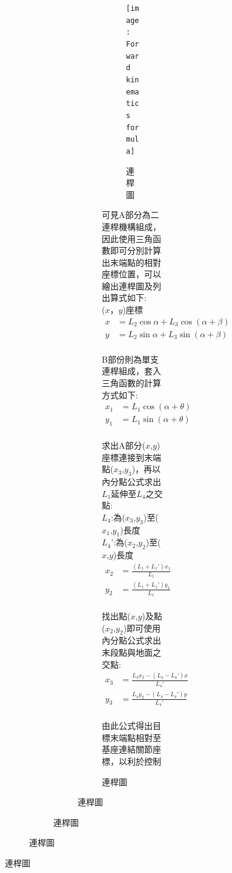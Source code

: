 \begin{figure}[htb!]
\begin{figure}[htb!]
\begin{figure}[htb!]
\begin{figure}[htb!]
\begin{figure}[htb!]
\begin{figure}[hbt!]
\begin{center}
\texttt{[image: Forward kinematics formula]}
\caption{\Large 連桿圖}\label{Forward kinematics formula}
\end{center}
\end{figure}

可見A部分為二連桿機構組成，因此使用三角函數即可分別計算出末端點的相對座標位置，可以繪出連桿圖及列出算式如下:\\
($x$，$y$)座標
\[
\begin{aligned}
x&=L_{2}\cos \alpha +L_{3}\cos \left( \alpha +\beta \right)\\
y&=L_{2}\sin \alpha +L_{3}\sin \left( \alpha +\beta \right)\\
\end{aligned}
\]

B部份則為單支連桿組成，套入三角函數的計算方式如下:\\
\[
\begin{aligned}
x_{1}&=L_{1}\cos \left( \alpha +\theta \right)\\
y_{1}&=L_{1}\sin \left( \alpha +\theta \right)\\
\end{aligned}
\]

求出A部分($x$,$y$)座標連接到末端點($x_3$,$y_3$)，再以內分點公式求出$L_1$延伸至$L_4$之交點:\\
$L_4$:為($x_3$,$y_3$)至($x_1$,$y_1$)長度\\
$L_4$':為($x_2$,$y_2$)至($x$,$y$)長度\\

\[
\begin{aligned}
x_{2}&= \frac{\left (L_{1} + L_{1}' \right) x_{1}}{L_{1}}\\
y_{2}&= \frac{\left (L_{1} + L_{1}' \right) y_{1}}{L_{1}}\\
\end{aligned}
\]

找出點($x$,$y$)及點($x_2$,$y_2$)即可使用內分點公式求出末段點與地面之交點:\\

\[
\begin{aligned}
x_{3}&= \frac{L_{4} x_{2} - \left (L_{4} - L_{4}' \right) x}{L_{4}'}\\
y_{3}&= \frac{L_{4} y_{2} - \left (L_{4} - L_{4}' \right) y}{L_{4}'}\\
\end{aligned}
\]

由此公式得出目標末端點相對至基座連結關節座標，以利於控制\\


\end{figure}
\end{figure}
\end{figure}
\end{figure}
\end{figure}

